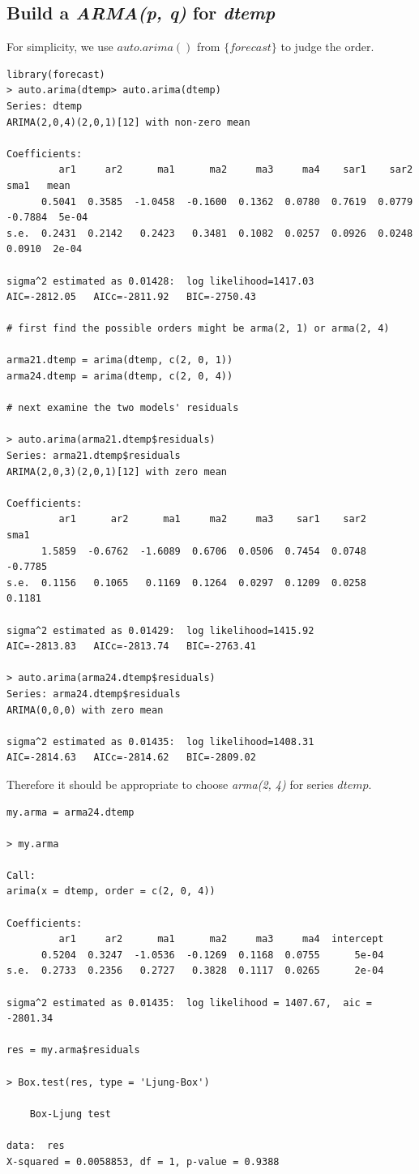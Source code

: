 \documentclass[a4paper, 11pt]{article}
\begin{document}
\subsection{Build a \textit{ARMA(p, q)} for \textit{dtemp}}
For simplicity, we use $auto.arima()$ from $\{forecast\}$ to judge the order.
\begin{verbatim}
library(forecast)
> auto.arima(dtemp> auto.arima(dtemp)
Series: dtemp 
ARIMA(2,0,4)(2,0,1)[12] with non-zero mean 

Coefficients:
         ar1     ar2      ma1      ma2     ma3     ma4    sar1    sar2     sma1   mean
      0.5041  0.3585  -1.0458  -0.1600  0.1362  0.0780  0.7619  0.0779  -0.7884  5e-04
s.e.  0.2431  0.2142   0.2423   0.3481  0.1082  0.0257  0.0926  0.0248   0.0910  2e-04

sigma^2 estimated as 0.01428:  log likelihood=1417.03
AIC=-2812.05   AICc=-2811.92   BIC=-2750.43

# first find the possible orders might be arma(2, 1) or arma(2, 4)

arma21.dtemp = arima(dtemp, c(2, 0, 1))
arma24.dtemp = arima(dtemp, c(2, 0, 4))

# next examine the two models' residuals

> auto.arima(arma21.dtemp$residuals)
Series: arma21.dtemp$residuals 
ARIMA(2,0,3)(2,0,1)[12] with zero mean     

Coefficients:
         ar1      ar2      ma1     ma2     ma3    sar1    sar2     sma1
      1.5859  -0.6762  -1.6089  0.6706  0.0506  0.7454  0.0748  -0.7785
s.e.  0.1156   0.1065   0.1169  0.1264  0.0297  0.1209  0.0258   0.1181

sigma^2 estimated as 0.01429:  log likelihood=1415.92
AIC=-2813.83   AICc=-2813.74   BIC=-2763.41

> auto.arima(arma24.dtemp$residuals)
Series: arma24.dtemp$residuals 
ARIMA(0,0,0) with zero mean     

sigma^2 estimated as 0.01435:  log likelihood=1408.31
AIC=-2814.63   AICc=-2814.62   BIC=-2809.02
\end{verbatim}
\indent Therefore it should be appropriate to choose \textit{arma(2, 4)} for series $dtemp$.

\begin{verbatim}
my.arma = arma24.dtemp

> my.arma

Call:
arima(x = dtemp, order = c(2, 0, 4))

Coefficients:
         ar1     ar2      ma1      ma2     ma3     ma4  intercept
      0.5204  0.3247  -1.0536  -0.1269  0.1168  0.0755      5e-04
s.e.  0.2733  0.2356   0.2727   0.3828  0.1117  0.0265      2e-04

sigma^2 estimated as 0.01435:  log likelihood = 1407.67,  aic = -2801.34

res = my.arma$residuals

> Box.test(res, type = 'Ljung-Box')

	Box-Ljung test

data:  res
X-squared = 0.0058853, df = 1, p-value = 0.9388
\end{verbatim}
\end{document}
